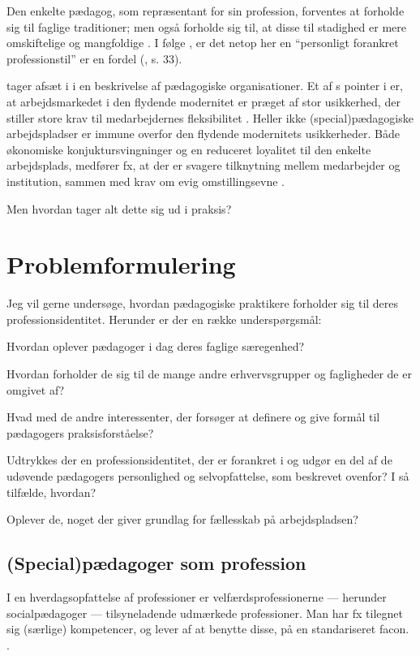 Den enkelte pædagog, som repræsentant for sin profession, forventes at forholde sig til faglige traditioner; men også forholde sig til, at disse til stadighed er mere omskiftelige og mangfoldige \autocite[s.33]{hansbolKonstruktionAfProfessionel2008}. I følge \citeauthor{hansbolKonstruktionAfProfessionel2008}, er det netop her en “personligt forankret professionstil” er en fordel (\citeyear{hansbolKonstruktionAfProfessionel2008}, s. 33).

\citeauthor{kofodOrganisationOgLedelse2016} tager afsæt i \citeauthor{baumanLiquidModernity2000} i en beskrivelse af pædagogiske organisationer. 
Et af \citeauthor{baumanLiquidModernity2000}s pointer i  er, at arbejdsmarkedet i den flydende modernitet er præget af stor usikkerhed, der stiller store krav til medarbejdernes fleksibilitet \autocite[s. 147; 151]{baumanLiquidModernity2000}.
Heller ikke (special)pædagogiske arbejdspladser er immune overfor den flydende modernitets usikkerheder.
Både økonomiske konjuktursvingninger og en reduceret loyalitet til den enkelte arbejdsplads, medfører fx, at der er svagere tilknytning mellem medarbejder og institution, sammen med krav om evig omstillingsevne \autocite[s. 166f]{kofodOrganisationOgLedelse2016}.

Men hvordan tager alt dette sig ud i praksis?

\section{Problemformulering}
Jeg vil gerne undersøge, hvordan pædagogiske praktikere forholder sig til deres professionsidentitet.
Herunder er der en række underspørgsmål:

Hvordan oplever pædagoger i dag deres faglige særegenhed?

Hvordan forholder de sig til de mange andre erhvervsgrupper og fagligheder de er omgivet af?

Hvad med de andre interessenter, der forsøger at definere og give formål til pædagogers praksisforståelse?

Udtrykkes der en professionsidentitet, der er forankret i og udgør en del af de udøvende pædagogers personlighed og selvopfattelse, som beskrevet ovenfor?
I så tilfælde, hvordan?

Oplever de, noget der giver grundlag for fællesskab på arbejdspladsen?

\subsection{(Special)pædagoger som profession}
I en hverdagsopfattelse af professioner er velfærdsprofessionerne — herunder socialpædagoger — tilsyneladende udmærkede professioner.
Man har fx tilegnet sig (særlige) kompetencer, og lever af at benytte disse, på en standariseret facon. \autocite[ss. 443-445]{frederiksenVelfaerdsprofessionerMellemOmsorg2017}.

